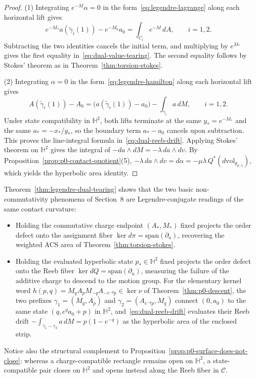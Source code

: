 \begin{proof}
(1) Integrating $e^{-M}\alpha=0$ in the form~\eqref{eq:legendre-lagrange} along
each horizontal lift gives
\[
  e^{-M_*}a(\tilde{\gamma}_i(1)) - e^{-M_0}a_0 = \int_{C_i} e^{-M}\,dA, \qquad i=1,2.
\]
Subtracting the two identities cancels the initial term, and multiplying by $e^{M_*}$
gives the first equality in~\eqref{eq:dual-value-tearing}. The second equality follows
by Stokes' theorem as in Theorem~\ref{thm:torsion-stokes}.

(2) Integrating $\alpha=0$ in the form~\eqref{eq:legendre-hamilton} along each
horizontal lift gives
\[
  A(\tilde{\gamma}_i(1)) - A_0 = \big(a(\tilde{\gamma}_i(1)) - a_0\big) - \int_{\bar{\gamma}_i} a\,dM, \qquad i=1,2.
\]
Under state compatibility in $\mathbb{H}^2$, both lifts terminate at the same
$y_*=e^{-M_*}$ and the same $a_*=-x_*/y_*$, so the boundary term $a_*-a_0$ cancels
upon subtraction. This proves the line-integral formula in~\eqref{eq:dual-reeb-drift}.
Applying Stokes' theorem on $\mathbb{H}^2$ gives the integral of $-da\wedge dM =
-\lambda\,da\wedge dv$. By Proposition~\ref{prop:p0-contact-quotient}(5),
$-\lambda\,da\wedge dv = d\alpha = -\mu\lambda\,Q^*(d\mathrm{vol}_{g_{\mu,\lambda}})$,
which yields the hyperbolic area identity.
\end{proof}

\begin{remark}
Theorem~\ref{thm:legendre-dual-tearing} shows that the two basic non-commutativity
phenomena of Section~8 are Legendre-conjugate readings of the same contact curvature:
\begin{itemize}
  \item Holding the commutative charge endpoint $(A_*,M_*)$ fixed projects the
  order defect onto the assignment fiber $\ker d\pi = \mathrm{span}(\partial_a)$,
  recovering the weighted ACS area of Theorem~\ref{thm:torsion-stokes}.
  \item Holding the evaluated hyperbolic state $p_*\in\mathbb{H}^2$ fixed projects
  the order defect onto the Reeb fiber $\ker dQ = \mathrm{span}(\partial_u)$,
  measuring the failure of the additive charge to descend to the motion group.
  For the elementary kernel word $h(p,q)=M_q A_p M_{-q} A_{-e^{-q}p}\in\ker\nu$
  of Theorem~\ref{thm:p0-descent}, the two prefixes $\gamma_1=(M_q,A_p)$ and
  $\gamma_2=(A_{e^{-q}p},M_q)$ connect $(0,a_0)$ to the same state $(q, e^q a_0 + p)$
  in $\mathbb{H}^2$, and~\eqref{eq:dual-reeb-drift} evaluates their Reeb drift
  $-\int_{\bar{\gamma}_1-\bar{\gamma}_2} a\,dM = p(1-e^{-q})$ as the hyperbolic area
  of the enclosed strip.
\end{itemize}
Notice also the structural complement to Proposition~\ref{prop:p0-surface-does-not-close}:
whereas a charge-compatible rectangle remains open on $\mathbb{H}^2$, a state-compatible
pair closes on $\mathbb{H}^2$ and opens instead along the Reeb fiber in $\mathcal{C}$.
\end{remark}
